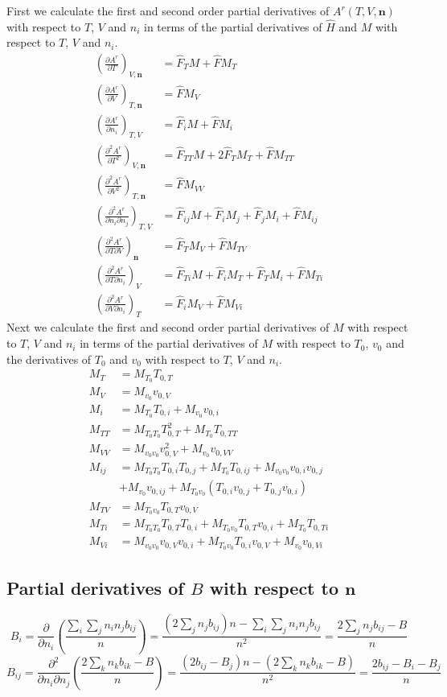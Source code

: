 \documentclass[internal,english]{sintefmemo2012}
\newcommand{\mbn}[0]{\mathbf n}
\newcommand*{\pdersub}[3]{\left(\frac{\partial #1}{\partial #2}\right)_{#3}}
\newcommand*{\pddersub}[3]{\left(\frac{\partial^2 #1}{\partial #2^2}\right)_{#3}}
\newcommand*{\pdcrosssub}[4]{\left(\frac{\partial^2 #1}{\partial #2 \partial #3}\right)_{#4}}
\newcommand*{\hF}[0]{\hat F}
\newcommand*{\hH}[0]{\hat H}
\newcommand{\lp}{\left(}
\newcommand{\rp}{\right)}
\numberwithin{equation}{section}
\begin{document}
First we calculate the first and second order partial derivatives of
$A^r(T,V,\mbn)$ with respect to $T$, $V$ and $n_i$ in terms of the
partial derivatives of $\hH$ and $M$ with respect to $T$, $V$ and
$n_i$.
\begin{align}
  \pdersub{A^r}{T}{V,\mbn} &= \hF_TM+\hF M_T \\
  \pdersub{A^r}{V}{T,\mbn} &= \hF M_V \\
  \pdersub{A^r}{n_i}{T,V} &= \hF_iM + \hF M_i \\
  \pddersub{A^r}{T}{V,\mbn} &= \hF_{TT}M + 2\hF_TM_T + \hF M_{TT} \\
  \pddersub{A^r}{V}{T,\mbn} &= \hF M_{VV} \\
  \pdcrosssub{A^r}{n_i}{n_j}{T,V} &= \hF_{ij}M + \hF_i M_j + \hF_j M_i + \hF M_{ij} \\
  \pdcrosssub{A^r}{T}{V}{\mbn} &= \hF_TM_V+\hF M_{TV} \\
  \pdcrosssub{A^r}{T}{n_i}{V} &= \hF_{Ti}M + \hF_i M_T + \hF_T M_i + \hF M_{Ti} \\
  \pdcrosssub{A^r}{V}{n_i}{T} &= \hF_i M_V + \hF M_{Vi}
\end{align}
Next we calculate the first and second order partial derivatives of
$M$ with respect to $T$, $V$ and $n_i$ in terms of the partial
derivatives of $M$ with respect to $T_0$, $v_0$ and the derivatives of
$T_0$ and $v_0$ with respect to $T$, $V$ and $n_i$.
\begin{align} %
  M_T    &= M_{T_0}T_{0,T} \\
  M_V    &= M_{v_0}v_{0,V} \\
  M_i    &= M_{T_0}T_{0,i} + M_{v_0}v_{0,i} \\
  M_{TT}  &= M_{T_0T_0}T_{0,T}^2 + M_{T_0}T_{0,TT} \\
  M_{VV}  &= M_{v_0v_0}v_{0,V}^2 + M_{v_0}v_{0,VV} \\
  M_{ij}  &= M_{T_0T_0}T_{0,i}T_{0,j} + M_{T_0}T_{0,ij} + M_{v_0v_0}v_{0,i}v_{0,j} \\
  &+ M_{v_0}v_{0,ij} + M_{T_0v_0}(T_{0,i}v_{0,j}+T_{0,j}v_{0,i}) \\
  M_{TV}  &= M_{T_0v_0}T_{0,T}v_{0,V} \\
  M_{Ti}  &= M_{T_0T_0}T_{0,T}T_{0,i} + M_{T_0v_0} T_{0,T} v_{0,i} + M_{T_0}T_{0,Ti} \\
  M_{Vi} &= M_{v_0v_0}v_{0,V}v_{0,i} + M_{T_0v_0} T_{0,i} v_{0,V} +
  M_{v_0}v_{0,Vi}
\end{align}
\subsection*{Partial derivatives of $B$ with respect to $\mbn$}
$$
B_i = \frac{\partial}{\partial n_i} \lp \frac{\sum_i \sum_j n_i n_j
  b_{ij}}{n} \rp = \frac{\lp 2 \sum_j n_j b_{ij} \rp n - \sum_i \sum_j
  n_i n_j b_{ij}}{n^2} = \frac{2 \sum_j n_j b_{ij} -B}{n}
$$
$$
B_{ij} = \frac{\partial^2}{\partial n_i \partial n_j} \lp \frac{2
  \sum_k n_k b_{ik} -B}{n} \rp = \frac{\lp 2b_{ij}-B_j \rp n - \lp 2
  \sum_k n_k b_{ik} -B \rp}{n^2} = \frac{2b_{ij}-B_i-B_j}{n}
$$
\end{document}
